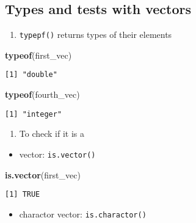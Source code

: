 \documentclass[
]{book}
\newenvironment{Shaded}{\begin{snugshade}}{\end{snugshade}}
\newcommand{\KeywordTok}[1]{\textcolor[rgb]{0.13,0.29,0.53}{\textbf{#1}}}
\newcommand{\NormalTok}[1]{#1}
\providecommand{\tightlist}{%
  \setlength{\itemsep}{0pt}\setlength{\parskip}{0pt}}
\begin{document}
\hypertarget{types-and-tests-with-vectors}{%
\subsection{Types and tests with vectors}\label{types-and-tests-with-vectors}}

\begin{enumerate}
\def\labelenumi{\arabic{enumi}.}
\tightlist
\item
  \texttt{typepf()} returns types of their elements
\end{enumerate}

\begin{Shaded}
\begin{Highlighting}[]
\KeywordTok{typeof}\NormalTok{(first_vec)}
\end{Highlighting}
\end{Shaded}

\begin{verbatim}
[1] "double"
\end{verbatim}

\begin{Shaded}
\begin{Highlighting}[]
\KeywordTok{typeof}\NormalTok{(fourth_vec)}
\end{Highlighting}
\end{Shaded}

\begin{verbatim}
[1] "integer"
\end{verbatim}

\begin{enumerate}
\def\labelenumi{\arabic{enumi}.}
\setcounter{enumi}{1}
\tightlist
\item
  To check if it is a
\end{enumerate}

\begin{itemize}
\tightlist
\item
  vector: \texttt{is.vector()}
\end{itemize}

\begin{Shaded}
\begin{Highlighting}[]
\KeywordTok{is.vector}\NormalTok{(first_vec)}
\end{Highlighting}
\end{Shaded}

\begin{verbatim}
[1] TRUE
\end{verbatim}

\begin{itemize}
\tightlist
\item
  charactor vector: \texttt{is.charactor()}
\end{itemize}
\end{document}
